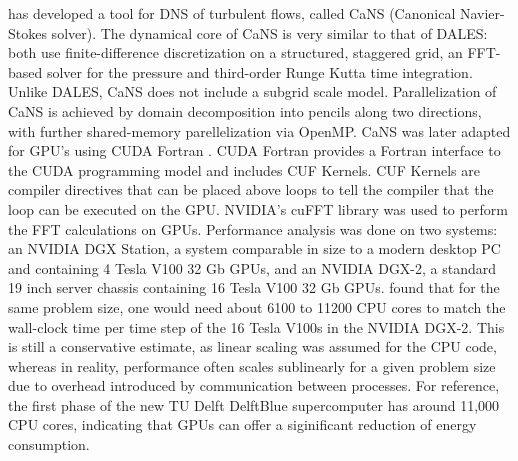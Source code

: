 \citet{costaFFTbasedFinitedifferenceSolver2018} has developed a tool for DNS of turbulent flows, called CaNS (Canonical Navier-Stokes solver). The dynamical core of CaNS is very similar to that of DALES: both use finite-difference discretization on a structured, staggered grid, an FFT-based solver for the pressure and third-order Runge Kutta time integration. Unlike DALES, CaNS does not include a subgrid scale model. Parallelization of CaNS is achieved by domain decomposition into pencils along two directions, with further shared-memory parellelization via OpenMP.
CaNS was later adapted for GPU's using CUDA Fortran \citep{costaGPUAccelerationCaNS2021}. CUDA Fortran provides a Fortran interface to the CUDA programming model and includes CUF Kernels. CUF Kernels are compiler directives that can be placed above loops to tell the compiler that the loop can be executed on the GPU. NVIDIA's cuFFT library was used to perform the FFT calculations on GPUs. Performance analysis was done on two systems: an NVIDIA DGX Station, a system comparable in size to a modern desktop PC and containing 4 Tesla V100 32 Gb GPUs, and an NVIDIA DGX-2, a standard 19 inch server chassis containing 16 Tesla V100 32 Gb GPUs. \citet{costaGPUAccelerationCaNS2021} found that for the same problem size, one would need about 6100 to 11200 CPU cores to match the wall-clock time per time step of the 16 Tesla V100s in the NVIDIA DGX-2. This is still a conservative estimate, as linear scaling was assumed for the CPU code, whereas in reality, performance often scales sublinearly for a given problem size due to overhead introduced by communication between processes. For reference, the first phase of the new TU Delft DelftBlue supercomputer has around 11,000 CPU cores, indicating that GPUs can offer a siginificant reduction of energy consumption.
